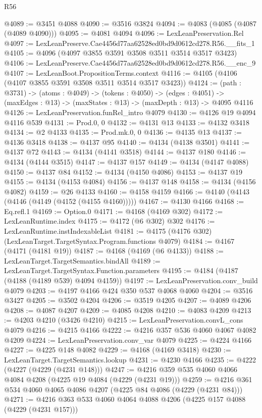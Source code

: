 \begin{lexlean}{R56}
\begin{coremodule}
@4089 := @3451 @4088
@4090 := @3516 @3824
@4094 := @4083 (@4085 (@4087 (@4089 @4090)))
@4095 := @4081 @4094
@4096 := LexLeanPreservation.Rel
@4097 := LexLeanPreserve.Cae4456d77aa62528ed0bd9d0612cd278.R56.__fits_1
@4105 := @4096 (@4097 @3855 @3591 @3508 @3511 @3514 @3517 @3423)
@4106 := LexLeanPreserve.Cae4456d77aa62528ed0bd9d0612cd278.R56.__enc_9
@4107 := LexLeanBoot.PropositionTerms.context
@4116 := @4105 (@4106 (@4107 @3855 @3591 @3508 @3511 @3514 @3517 @3423))
@4124 := (path : @3731) ->
  (atoms : @4049) ->
  (tokens : @4050) ->
  (edges : @4051) -> (maxEdges : @13) -> (maxStates : @13) -> (maxDepth : @13) -> @4095 @4116
@4126 := LexLeanPreservation.funRel_intro @4079
@4130 := @4126 @19 @4094 @4116 @539
@4131 := Prod.{0, 0}
@4132 := @4131 @13
@4133 := @4132 @3418
@4134 := @2 @4133
@4135 := Prod.mk.{0, 0}
@4136 := @4135 @13
@4137 := @4136 @3418
@4138 := @4137 @95
@4140 := @4134 (@4138 @3501)
@4141 := @4137 @72
@4143 := @4134 (@4141 @3518)
@4144 := @4137 @180
@4146 := @4134 (@4144 @3515)
@4147 := @4137 @157
@4149 := @4134 (@4147 @4088)
@4150 := @4137 @84
@4152 := @4134 (@4150 @4086)
@4153 := @4137 @19
@4155 := @4134 (@4153 @4084)
@4156 := @4137 @148
@4158 := @4134 (@4156 @4082)
@4159 := @26 @4133
@4160 := @4158 @4159
@4166 := @4140 (@4143 (@4146 (@4149 (@4152 (@4155 @4160)))))
@4167 := @4130 @4166
@4168 := Eq.refl.{1}
@4169 := Option.{0}
@4171 := @4168 (@4169 @302)
@4172 := LexLeanRuntime.index
@4175 := @4172 (@6 @302) @302
@4176 := LexLeanRuntime.instIndexableList
@4181 := @4175 (@4176 @302) (LexLeanTarget.TargetSyntax.Program.functions @4079)
@4184 := @4167 (@4171 (@4181 @19))
@4187 := @4168 (@4169 (@6 @4133))
@4188 := LexLeanTarget.TargetSemantics.bindAll
@4189 := LexLeanTarget.TargetSyntax.Function.parameters
@4195 := @4184 (@4187 (@4188 (@4189 @539) @4094 @4159))
@4197 := LexLeanPreservation.conv_build @4079
@4203 := @4197 @4166 @424 @350 @537 @4068 @4060
@4204 := @3516 @3427
@4205 := @3502 @4204
@4206 := @3519 @4205
@4207 := @4089 @4206
@4208 := @4087 @4207
@4209 := @4085 @4208
@4210 := @4083 @4209
@4213 := @4203 @4210 (@3426 @4210)
@4215 := LexLeanPreservation.convL_cons @4079
@4216 := @4215 @4166
@4222 := @4216 @357 @536 @4060 @4067 @4082 @4209
@4224 := LexLeanPreservation.conv_var @4079
@4225 := @4224 @4166
@4227 := @4225 @148 @4082
@4229 := @4168 (@4169 @3418)
@4230 := LexLeanTarget.TargetSemantics.lookup
@4231 := @4230 @4166
@4235 := @4222 (@4227 (@4229 (@4231 @148)))
@4247 := @4216 @359 @535 @4060 @4066 @4084 @4208 (@4225 @19 @4084 (@4229 (@4231 @19)))
@4259 := @4216 @361 @534 @4060 @4065 @4086 @4207 (@4225 @84 @4086 (@4229 (@4231 @84)))
@4271 := @4216 @363 @533 @4060 @4064 @4088 @4206 (@4225 @157 @4088 (@4229 (@4231 @157)))

\end{coremodule}
\end{lexlean}
